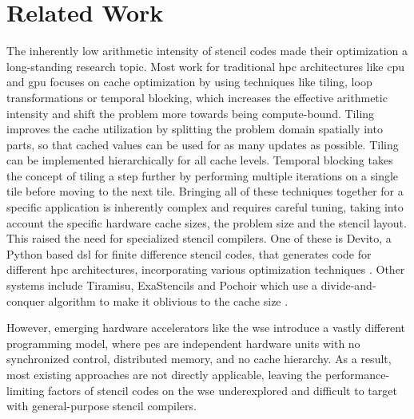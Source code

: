\chapter{Related Work}
The inherently low arithmetic intensity of stencil codes made their optimization a long-standing research topic.
Most work for traditional \ac{hpc} architectures like \ac{cpu} and \ac{gpu} focuses on cache optimization by using techniques like tiling, loop transformations or temporal blocking, which increases the effective arithmetic intensity and shift the problem more towards being compute-bound.
Tiling improves the cache utilization by splitting the problem domain spatially into parts, so that cached values can be used for as many updates as possible.
Tiling can be implemented hierarchically for all cache levels.
Temporal blocking takes the concept of tiling a step further by performing multiple iterations on a single tile before moving to the next tile.
Bringing all of these techniques together for a specific application is inherently complex and requires careful tuning, taking into account the specific hardware cache sizes, the problem size and the stencil layout.
This raised the need for specialized stencil compilers.
One of these is Devito, a Python based \ac{dsl} for finite difference stencil codes, that generates code for different \ac{hpc} architectures, incorporating various optimization techniques \cite{lange2016devito}. 
Other systems include Tiramisu, ExaStencils and Pochoir which use a divide-and-conquer algorithm to make it oblivious to the cache size \cite{baghdadi2019tiramisu,lengauer2014exastencils,tang2011pochoir}.

However, emerging hardware accelerators like the \ac{wse} introduce a vastly different programming model, where \acp{pe} are independent hardware units with no synchronized control, distributed memory, and no cache hierarchy.
As a result, most existing approaches are not directly applicable, leaving the performance-limiting factors of stencil codes on the \ac{wse} underexplored and difficult to target with general-purpose stencil compilers.

